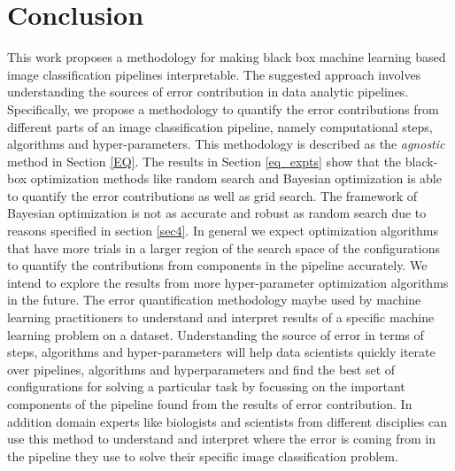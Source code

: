 \section{Conclusion}
This work proposes a methodology for making black box machine learning based image classification pipelines interpretable. The suggested approach involves understanding the sources of error contribution in data analytic pipelines. Specifically, we propose a methodology to quantify the error contributions from different parts of an image classification pipeline, namely computational steps, algorithms and hyper-parameters. This methodology is described as the \textit{agnostic} method in Section \ref{EQ}. The results in Section \ref{eq_expts} show that the black-box optimization methods like random search and Bayesian optimization is able to quantify the error contributions as well as grid search. The framework of Bayesian optimization is not as accurate and robust as random search due to reasons specified in section \ref{sec4}. In general we expect optimization algorithms that have more trials in a larger region of the search space of the configurations to quantify the contributions from components in the pipeline accurately. We intend to explore the results from more hyper-parameter optimization algorithms in the future. 
The error quantification methodology maybe used by machine learning practitioners to understand and interpret results of a specific machine learning problem on a dataset. Understanding the source of error in terms of steps, algorithms and hyper-parameters will help data scientists quickly iterate over pipelines, algorithms and hyperparameters and find the best set of configurations for solving a particular task by focussing on the important components of the pipeline found from the results of error contribution. In addition domain experts like biologists and scientists from different disciplies can use this method to understand and interpret where the error is coming from in the pipeline they use to solve their specific image classification problem.
